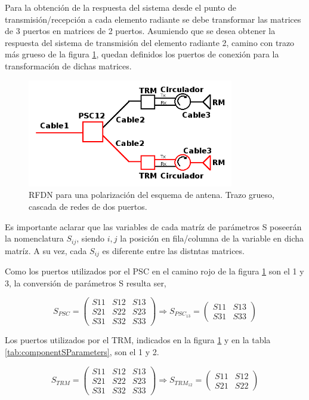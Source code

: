 Para la obtención de la respuesta del sistema desde el punto de transmisión/recepción a cada elemento radiante se debe
transformar las matrices de 3 puertos en matrices de 2 puertos. Asumiendo que se desea obtener la respuesta del sistema de
transmisión del elemento radiante 2, camino con trazo más grueso de la figura \ref{fig:antennaSLoop}, quedan definidos los puertos de
conexión para la transformación de dichas matrices.

\begin{figure}[H]
 \centering
 \includegraphics[width=9cm]{gfx/RFDNLoop.png}
 \caption{RFDN para una polarización del esquema de antena. Trazo grueso, cascada de redes de dos puertos.}
 \label{fig:antennaSLoop}
\end{figure}

Es importante aclarar que las variables de cada matríz de parámetros S poseerán la nomenclatura $S_{ij}$, siendo $i,j$ la
posición en fila/columna de la variable en dicha matríz. A su vez, cada $S_{ij}$ es diferente entre las distntas matrices. 

Como los puertos utilizados por el PSC en el camino rojo de la figura \ref{fig:antennaSLoop} son el 1 y 3, la conversión de
parámetros S resulta ser,

$$
	S_{PSC} = \begin{pmatrix} S11&S12&S13 \\ S21&S22&S23 \\ S31&S32&S33\end{pmatrix} \Rightarrow
	S_{PSC_{13}} = \begin{pmatrix} S11&S13 \\ S31&S33 \end{pmatrix}
$$

Los puertos utilizados por el TRM, indicados en la figura \ref{fig:antennaSLoop} y en la tabla \ref{tab:componentSParameters},
son el 1 y 2. 

$$
	S_{TRM} = \begin{pmatrix} S11&S12&S13 \\ S21&S22&S23 \\ S31&S32&S33\end{pmatrix} \Rightarrow
	S_{TRM_{12}} = \begin{pmatrix} S11&S12 \\ S21&S22 \end{pmatrix}
$$

